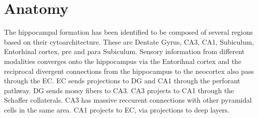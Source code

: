 \section{Anatomy}
The hippocampal formation has been identified to be composed of several regions based on their cytoarchitecture. These are Dentate Gyrus, CA3, CA1, Subiculum, Entorhinal cortex, pre and para Subiculum. Sensory information from different modalities converges onto the hippocampus via the Entorihnal cortex and the reciprocal divergent connections from the hippocampus to the neocortex also pass through the EC. EC sends projections to DG and CA1 through the perforant pathway. DG sends mossy fibers to CA3. CA3 projects to CA1 through the Schaffer collaterals. CA3 has massive reccurent connections with other pyramidal cells in the same area. CA1 projects to EC, via projections to deep layers. 